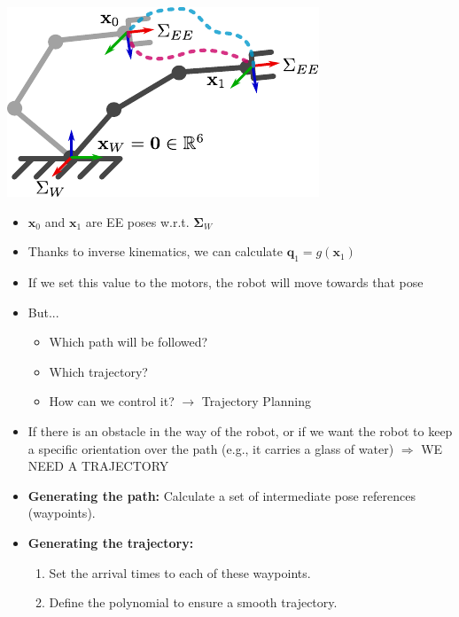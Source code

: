 \documentclass[10pt, aspectratio=169]{beamer}
\theoremstyle{remark}
\theoremstyle{definition}
\begin{document}
\begin{frame}[allowframebreaks]
\begin{itemize}
	\end{itemize}

    \framebreak

    \begin{center}
    \begin{minipage}{.45\linewidth}
    \includegraphics{images/manipulator_path.pdf}
    \end{minipage}%
    \begin{minipage}{.6\linewidth}
    \begin{itemize}
        \item $\mathbf{x}_0$ and $\mathbf{x}_1$ are EE poses w.r.t. $\mathbf{\Sigma}_W$
        \item Thanks to inverse kinematics, we can calculate $\mathbf{q}_1 = g(\mathbf{x}_1)$ 
        \item If we set this value to the motors, the robot will move towards that pose
        \item But...
        \begin{itemize}
            \item Which path will be followed?
            \item Which trajectory? 
            \item How can we control it? $\rightarrow$ Trajectory Planning
        \end{itemize}
    \end{itemize}
    \end{minipage}
    \end{center}

    \framebreak
    \begin{itemize}
        \item If there is an obstacle in the way of the robot, or if we want the robot to keep a specific orientation over the path (e.g., it carries a glass of water) $\Rightarrow$ \textcolor{uma_pink}{WE NEED A TRAJECTORY}
        \item \textbf{Generating the path:} Calculate a set of intermediate pose references (waypoints).
        \item \textbf{Generating the trajectory:} 
        \begin{enumerate}
            \item Set the arrival times to each of these waypoints.
            \item Define the polynomial to ensure a smooth trajectory.
        \end{enumerate}


\end{itemize}
\end{frame}
\end{document}
